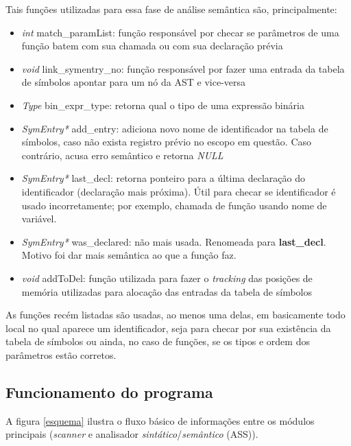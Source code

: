 \documentclass[
	article,			%
	11pt,				%
	oneside,			%
	a4paper,			%
	english,			%
	brazil,				%
	sumario=tradicional
	]{abntex2}
\renewcommand{\it}[1]{\textit{#1}}
\renewcommand{\bf}[1]{\textbf{#1}}
\begin{document}
Tais funções utilizadas para essa fase de análise semântica são, principalmente:

\begin{itemize}
	\item \it{int} match\_paramList: função responsável por checar se parâmetros de uma função batem com sua chamada ou com sua declaração prévia
	\item \it{void} link\_symentry\_no: função responsável por fazer uma entrada da tabela de símbolos apontar para um nó da AST e vice-versa
	\item \it{Type} bin\_expr\_type: retorna qual o tipo de uma expressão binária
	\item \it{SymEntry*} add\_entry: adiciona novo nome de identificador na tabela de símbolos, caso não exista registro prévio no escopo em questão. Caso contrário, acusa erro semântico e retorna \it{NULL}
	\item \it{SymEntry*} last\_decl: retorna ponteiro para a última declaração do identificador (declaração mais próxima). Útil para checar se identificador é usado incorretamente; por exemplo, chamada de função usando nome de variável.
  \item	\it{SymEntry*} was\_declared: não mais usada. Renomeada para \bf{last\_decl}. Motivo foi dar mais semântica ao que a função faz.
	\item \it{void} addToDel: função utilizada para fazer o \it{tracking} das posições de memória utilizadas para alocação das entradas da tabela de símbolos
\end{itemize}

As funções recém listadas são usadas, ao menos uma delas, em basicamente todo local no qual aparece um identificador, seja para checar por sua existência da tabela de símbolos ou ainda, no caso de funções, se os tipos e ordem dos parâmetros estão corretos.

\subsection{Funcionamento do programa}

A figura \ref{esquema} ilustra o fluxo básico de informações entre os módulos principais (\it{scanner} e analisador \it{sintático}/\it{semântico} (ASS)).
\end{document}
